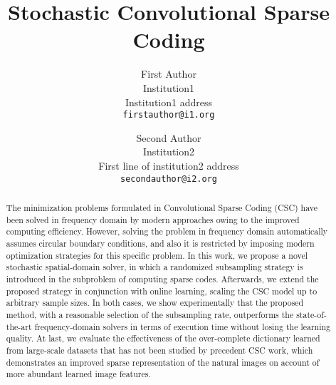 \documentclass[10pt,twocolumn,letterpaper]{article}
\begin{document}
\title{Stochastic Convolutional Sparse Coding}

\author{First Author\\
Institution1\\
Institution1 address\\
{\tt\small firstauthor@i1.org}
\and
Second Author\\
Institution2\\
First line of institution2 address\\
{\tt\small secondauthor@i2.org}
}

\maketitle

\begin{abstract}
The minimization problems formulated in Convolutional Sparse Coding (CSC) have been solved in frequency domain by modern approaches owing to the improved computing efficiency. However, solving the problem in frequency domain automatically assumes circular boundary conditions, and also it is restricted by imposing modern optimization strategies for this specific problem. In this work, we propose a novel stochastic spatial-domain solver, in which a randomized subsampling strategy is introduced in the subproblem of computing sparse codes. Afterwards, we extend the proposed strategy in conjunction with online learning, scaling the CSC model up to arbitrary sample sizes. In both cases, we show experimentally that the proposed method, with a reasonable selection of the subsampling rate, outperforms the state-of-the-art frequency-domain solvers in terms of execution time without losing the learning quality. At last, we evaluate the effectiveness of the over-complete dictionary learned from large-scale datasets that has not been studied by precedent CSC work, which demonstrates an improved sparse representation of the natural images on account of more abundant learned image features.
\end{abstract}











{\small


}

\clearpage
\appendix


\end{document}
